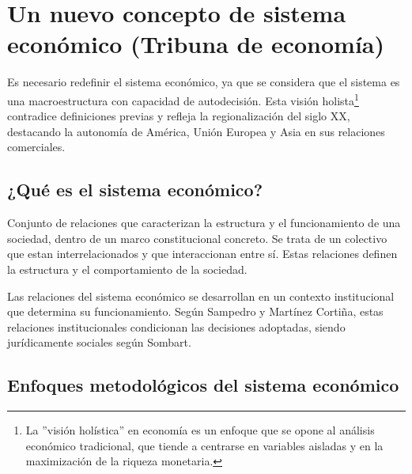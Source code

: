 \documentclass[12pt]{report} %
\begin{document}
\hypertarget{un-nuevo-concepto-de-sistema-econuxf3mico-tribuna-de-economuxeda}{%
\section{Un nuevo concepto de sistema económico (Tribuna de
economía)}\label{un-nuevo-concepto-de-sistema-econuxf3mico-tribuna-de-economuxeda}}

Es necesario redefinir el sistema económico, ya que se considera que el
sistema es una macroestructura con capacidad de autodecisión. Esta
visión
holista\footnote{La ''visión holística'' en economía es un enfoque que se opone al análisis económico tradicional, que tiende a centrarse en variables aisladas y en la maximización de la riqueza monetaria.}
contradice definiciones previas y refleja la regionalización del siglo
XX, destacando la autonomía de América, Unión Europea y Asia en sus
relaciones comerciales.

\hypertarget{quuxe9-es-el-sistema-econuxf3mico}{%
\subsection{¿Qué es el sistema
económico?}\label{quuxe9-es-el-sistema-econuxf3mico}}

Conjunto de relaciones que caracterizan la estructura y el
funcionamiento de una sociedad, dentro de un marco constitucional
concreto. Se trata de un colectivo que estan interrelacionados y que
interaccionan entre sí. Estas relaciones definen la estructura y el
comportamiento de la sociedad.

Las relaciones del sistema económico se desarrollan en un contexto
institucional que determina su funcionamiento. Según Sampedro y Martínez
Cortiña, estas relaciones institucionales condicionan las decisiones
adoptadas, siendo jurídicamente sociales según Sombart.

\hypertarget{enfoques-metodoluxf3gicos-del-sistema-econuxf3mico}{%
\subsection{Enfoques metodológicos del sistema
económico}\label{enfoques-metodoluxf3gicos-del-sistema-econuxf3mico}}
\end{document}
